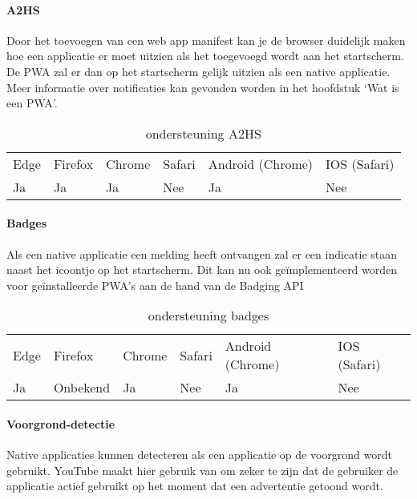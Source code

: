 \paragraph{A2HS}


 Door het toevoegen van een web app manifest kan je de browser duidelijk maken hoe een applicatie er moet uitzien als het toegevoegd wordt aan het startscherm. De PWA zal er dan op het startscherm gelijk uitzien als een native applicatie.
Meer informatie over notificaties kan gevonden worden in het hoofdstuk ‘Wat is een PWA’.


\begin{table}[]
	\begin{tabular}{llllll}
		Edge & Firefox & Chrome & Safari & Android (Chrome) & IOS (Safari) \\
		Ja   & Ja      &  Ja     & Nee     & Ja               & Nee          
	\end{tabular}	
	\caption{ondersteuning A2HS }
	\label{ondersteuning A2HS}
\end{table}


\paragraph{Badges}

Als een native applicatie een melding heeft ontvangen zal er een indicatie staan naast het icoontje op het startscherm. Dit kan nu ook geïmplementeerd worden voor geïnstalleerde PWA’s aan de hand van de Badging API \autocite{LePage2020a}

\begin{table}[]
	\begin{tabular}{llllll}
		Edge & Firefox & Chrome & Safari & Android (Chrome) & IOS (Safari) \\
		Ja   & Onbekend      &  Ja     & Nee     & Ja               & Nee          
	\end{tabular}	
	\caption{ondersteuning badges }
	\label{ondersteuning badges}
\end{table}

\paragraph{Voorgrond-detectie }

Native applicaties kunnen detecteren als een applicatie op de voorgrond wordt gebruikt. YouTube maakt hier gebruik van om zeker te zijn dat de gebruiker de applicatie actief gebruikt op het moment dat een advertentie getoond wordt.

